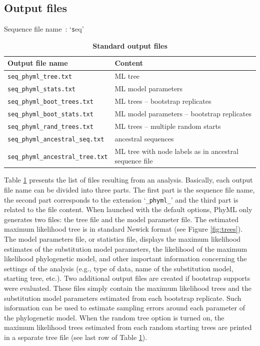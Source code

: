 \documentclass[a4paper,12pt]{article}
\newcommand{\x}[1]{\texttt{#1}}
\begin{document}
\subsection{Output files}

\begin{table}
Sequence file name~: `{\x seq}'\\
\begin{center}
\begin{tabular}{ll}
\hline
Output file name & Content \\
\hline
\x{seq\_phyml\_tree.txt} & ML tree\\
\x{seq\_phyml\_stats.txt} &  ML model parameters\\
\x{seq\_phyml\_boot\_trees.txt} & ML trees -- bootstrap replicates\\
\x{seq\_phyml\_boot\_stats.txt} & ML model parameters -- bootstrap replicates \\
\x{seq\_phyml\_rand\_trees.txt} & ML trees -- multiple random starts\\
\x{seq\_phyml\_ancestral\_seq.txt} & ancestral sequences\\
\x{seq\_phyml\_ancestral\_tree.txt} & ML tree with node labels as in ancestral sequence file\\
\hline
\end{tabular}
\end{center}
\caption{{\bf Standard output files}}\label{tab:output}
\end{table}

Table  \ref{tab:output} presents  the list  of files  resulting from  an analysis.   Basically, each
output file  name can be divided into  three parts.  The first  part is the sequence  file name, the
second part corresponds to  the extension `\x{\_phyml\_}' and the third part  is related to the file
content.  When launched with the default options,  PhyML only generates two files: the tree file and
the model parameter file.   The estimated maximum likelihood tree is in  standard Newick format (see
Figure  \ref{fig:trees}).  The  model  parameters file,  or  statistics file,  displays the  maximum
likelihood estimates of the substitution model  parameters, the likelihood of the maximum likelihood
phylogenetic model, and  other important information concerning the settings  of the analysis (e.g.,
type of data, name of the substitution model, starting tree, etc.).  Two additional output files are
created if  bootstrap supports were  evaluated.  These files  simply contain the  maximum likelihood
trees  and  the  substitution  model  parameters  estimated from  each  bootstrap  replicate.   Such
information can be used to estimate sampling errors around each parameter of the phylogenetic model.
When the random  tree option is turned on,  the maximum likelihood trees estimated  from each random
starting trees are printed in a separate tree file (see last row of Table \ref{tab:output}).
\end{document}
